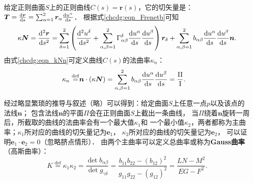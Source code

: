 给定正则曲面$S$上的正则曲线$C(s)=\boldsymbol{r}(s)$，它的切矢量是：
$\boldsymbol{T}=\frac{{\rm d}\boldsymbol{r}}{{\rm d}s}= 
\sum_{\alpha=1}^{2}\boldsymbol{r}_\alpha \frac{{\rm d}u^\alpha}{{\rm d}s}$．
根据式\eqref{chcdg:eqn_Frenetb}可知
\begin{equation}\label{chcdg:eqn_kNn}  %
    \kappa \boldsymbol{N} =  \frac{{\rm d}^2\boldsymbol{r}}{{\rm d}s^2}
    = \sum_{\delta=1}^{2}\left( \frac{{\rm d}^2 u^\delta }{{\rm d}s^2} 
    + \sum_{\alpha,\beta=1}^{2}\Gamma^\delta_{\alpha\beta} 
    \frac{{\rm d}u^\alpha}{{\rm d}s}\frac{{\rm d}u^\beta}{{\rm d}s}\right) \boldsymbol{r}_\delta
    +\sum_{\alpha,\beta=1}^{2} b_{\alpha \beta}\frac{{\rm d}u^\alpha}
    {{\rm d}s}\frac{{\rm d}u^\beta}{{\rm d}s} \boldsymbol{n} .
\end{equation} %
由式\eqref{chcdg:eqn_kNn}可定义曲线$C(s)$的{\heiti 法曲率}$\kappa_n$：
\begin{align}
    \kappa_n \overset{\mathrm {def}}{=} & \boldsymbol{n} \cdot (\kappa \boldsymbol{N})
    =\sum_{\alpha,\beta=1}^{2} b_{\alpha\beta}\frac{{\rm d}u^\alpha}{{\rm d}s}
    \frac{{\rm d}u^\beta}{{\rm d}s}
    =\frac{{\rm II}}{\rm I}.  \label{chcdg:eqn_kn} 
\end{align}


经过略显繁琐的推导与叙述（略）可以得到：给定曲面$S$上任意一点$p$以及该点的法线$\boldsymbol{n}$；
包含法线$\boldsymbol{n}$的平面$\Pi$会在正则曲面$S$上截出一条曲线，
当$\Pi$绕着$\boldsymbol{n}$旋转一周后，所截取的曲线的法曲率会有一个最大值$\kappa_1$和
一个最小值$\kappa_2$，两者都称为{\heiti 主曲率}；$\kappa_1$所对应的曲线的切矢量记为$\boldsymbol{e}_1$，
$\kappa_2$所对应的曲线的切矢量记为$\boldsymbol{e}_2$，
可以证明$\boldsymbol{e}_1\cdot \boldsymbol{e}_2=0$（忽略脐点情形）．
由两个主曲率可以定义{\heiti 总曲率}或称为{\bfseries \heiti Gauss曲率}（高斯曲率）：
\begin{equation}\label{chcdg:eqn_Gauss-Curvature}
    K \overset{\mathrm {def}}{=}\kappa_1 \kappa_2  
    =\frac{\det b_{\alpha\beta}}{\det g_{\gamma\delta}} 
    =\frac{b_{11} b_{22} -(b_{12})^2}{g_{11} g_{22} -(g_{12})^2}
    = \frac{LN-M^2}{EG-F^2} .
\end{equation} %


